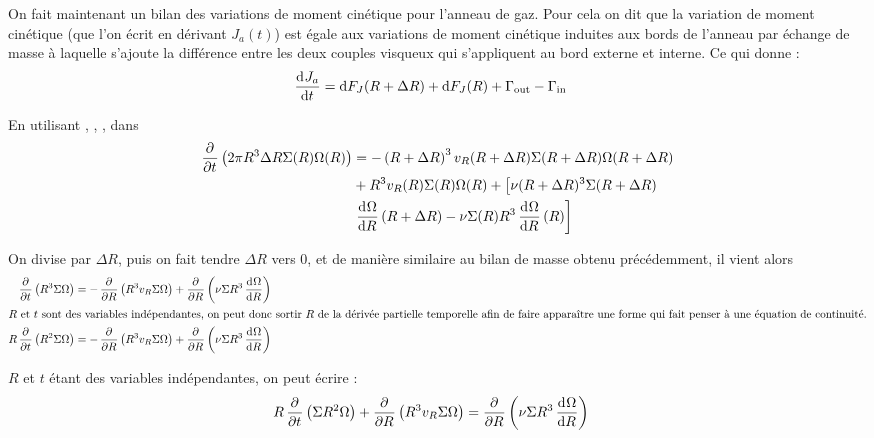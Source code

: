 \bigskip

On fait maintenant un bilan des variations de moment cinétique pour l'anneau de gaz. Pour cela on dit que la variation de moment cinétique (que l'on écrit en dérivant $J_a(t)$) est égale aux variations de moment cinétique induites aux bords de l'anneau par échange de masse à laquelle s'ajoute la différence entre les deux couples visqueux qui s'appliquent au bord externe et interne. Ce qui donne : 
\begin{align}
\mathinner{ \dfrac{\operatorname{d \!}{^{}}J_a}{\operatorname{d \!}{{t}^{}}} } &= \operatorname{d \!} F_J(R+\Delta R) + \operatorname{d \!} F_J(R) + \Gamma_\text{out} - \Gamma_\text{in}\label{eq:cons_J_a2}
\end{align}

En utilisant , , , dans 
\begin{align*}
\begin{split}
\mathinner{ \dfrac{\partial{^{}}}{\partial{{t}^{}}} }\left(2\pi R^3 \Delta R \Sigma(R)\Omega(R)\right) &= -\left(R+\Delta R\right)^3v_R(R+\Delta R) \Sigma(R+\Delta R) \Omega(R+\Delta R)\\
& + R^3 v_R(R) \Sigma(R) \Omega(R) + \left[\nu(R+\Delta R)^3\Sigma(R+\Delta R)\right.\\
&\left. \mathinner{ \dfrac{\operatorname{d \!}{^{}}\Omega}{\operatorname{d \!}{{R}^{}}} }(R+\Delta R)-\nu \Sigma(R) R^3 \mathinner{ \dfrac{\operatorname{d \!}{^{}}\Omega}{\operatorname{d \!}{{R}^{}}} }(R)\right]
\end{split}
\end{align*}



On divise par $\Delta R$, puis on fait tendre $\Delta R$ vers 0, et de manière similaire au bilan de masse obtenu précédemment, il vient alors 
\begin{align*}
\mathinner{ \dfrac{\partial{^{}}}{\partial{{t}^{}}} }\left(R^3 \Sigma\Omega\right) &= -\mathinner{ \dfrac{\partial{^{}}}{\partial{{R}^{}}} }\left(R^3 v_R \Sigma \Omega\right) + \mathinner{ \dfrac{\partial{^{}}}{\partial{{R}^{}}} }\left(\nu \Sigma R^3 \mathinner{ \dfrac{\operatorname{d \!}{^{}}\Omega}{\operatorname{d \!}{{R}^{}}} }\right)\\
\intertext{$R$ et $t$ sont des variables indépendantes, on peut donc sortir $R$ de la dérivée partielle temporelle afin de faire apparaître une forme qui fait penser à une équation de continuité.}
R\mathinner{ \dfrac{\partial{^{}}}{\partial{{t}^{}}} }\left(R^2 \Sigma\Omega\right) &= -\mathinner{ \dfrac{\partial{^{}}}{\partial{{R}^{}}} }\left(R^3 v_R \Sigma \Omega\right) + \mathinner{ \dfrac{\partial{^{}}}{\partial{{R}^{}}} }\left(\nu \Sigma R^3 \mathinner{ \dfrac{\operatorname{d \!}{^{}}\Omega}{\operatorname{d \!}{{R}^{}}} }\right)
\end{align*}

$R$ et $t$ étant des variables indépendantes, on peut écrire :
\begin{align}
R\mathinner{ \dfrac{\partial{^{}}}{\partial{{t}^{}}} }\left(\Sigma R^2\Omega\right) + \mathinner{ \dfrac{\partial{^{}}}{\partial{{R}^{}}} }\left(R^3 v_R \Sigma \Omega\right) &= \mathinner{ \dfrac{\partial{^{}}}{\partial{{R}^{}}} }\left(\nu \Sigma R^3 \mathinner{ \dfrac{\operatorname{d \!}{^{}}\Omega}{\operatorname{d \!}{{R}^{}}} }\right)\label{eq:ang_mom_01}
\end{align}

